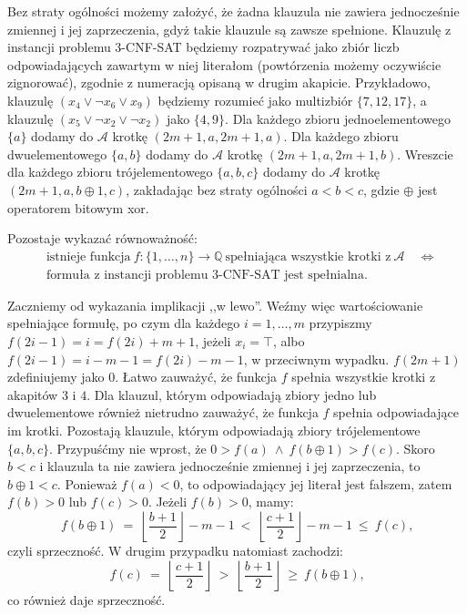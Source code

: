 \documentclass[12pt]{article}
\begin{document}
	\medskip
	
	Bez straty ogólności możemy założyć, że żadna klauzula nie zawiera
	jednocześnie zmiennej i jej zaprzeczenia, gdyż takie klauzule są zawsze
	spełnione. Klauzulę z instancji problemu 3-CNF-SAT będziemy rozpatrywać jako
	zbiór liczb odpowiadających zawartym w niej literałom (powtórzenia możemy
	oczywiście zignorować), zgodnie z numeracją opisaną w drugim akapicie.
	Przykładowo, klauzulę \((x_{4} \vee \neg x_{6} \vee x_{9})\) będziemy
	rozumieć jako multizbiór \(\{7, 12, 17\}\), a klauzulę \((x_{5} \vee \neg
	x_{2} \vee \neg x_{2})\) jako \(\{4, 9\}\). Dla każdego zbioru
	jednoelementowego \(\{a\}\) dodamy do \(\mathcal{A}\) krotkę \((2m + 1, a,
	2m + 1, a)\). Dla każdego zbioru dwuelementowego \(\{a, b\}\) dodamy do
	\(\mathcal{A}\) krotkę \((2m + 1, a, 2m + 1, b)\). Wreszcie dla każdego
	zbioru trójelementowego \(\{a, b, c\}\) dodamy do \(\mathcal{A}\) krotkę
	\((2m + 1, a, b \oplus 1, c)\), zakładając bez straty ogólności \(a < b <
	c\), gdzie \(\oplus\) jest operatorem bitowym xor.
	
	\medskip
	
	Pozostaje wykazać równoważność:
	\begin{align*}
		&\text{istnieje funkcja} \ f : \{1, \ldots, n\} \to \mathbb{Q} \
		\text{spełniająca wszystkie krotki z} \ \mathcal{A} \quad \iff \\
		&\text{formuła z instancji problemu 3-CNF-SAT jest spełnialna.}
	\end{align*}
	
	\medskip
	
	Zaczniemy od wykazania implikacji ,,w lewo''. Weźmy więc wartościowanie
	spełniające formułę, po czym dla każdego \(i = 1, \ldots, m\) przypiszmy
	\(f(2i - 1) = i = f(2i) + m + 1\), jeżeli \(x_{i} = \top\), albo \(f(2i - 1)
	= i - m - 1 = f(2i) - m - 1\), w przeciwnym wypadku. \(f(2m + 1)\)
	zdefiniujemy jako \(0\). Łatwo zauważyć, że funkcja \(f\) spełnia wszystkie
	krotki z akapitów \(3\) i \(4\). Dla klauzul, którym odpowiadają zbiory
	jedno lub dwuelementowe również nietrudno zauważyć, że funkcja \(f\) spełnia
	odpowiadające im krotki. Pozostają klauzule, którym odpowiadają zbiory
	trójelementowe \(\{a, b, c\}\). Przypuśćmy nie wprost, że \(0 > f(a) \
	\wedge \ f(b \oplus 1) > f(c)\). Skoro \(b < c\) i klauzula ta nie zawiera
	jednocześnie zmiennej i jej zaprzeczenia, to \(b \oplus 1 < c\). Ponieważ
	\(f(a) < 0\), to odpowiadający jej literał jest fałszem, zatem \(f(b) > 0\)
	lub \(f(c) > 0\). Jeżeli \(f(b) > 0\), mamy:
	\[ f(b \oplus 1) \ = \ \left\lfloor \frac{b + 1}{2} \right\rfloor - m - 1 \
	< \ \left\lfloor \frac{c + 1}{2} \right\rfloor - m - 1 \ \leqslant \ f(c)
	\text{,} \]
	czyli sprzeczność. W drugim przypadku natomiast zachodzi:
	\[ f(c) \ = \ \left\lfloor \frac{c + 1}{2} \right\rfloor \ > \ \left\lfloor
	\frac{b + 1}{2} \right\rfloor \ \geqslant \ f(b \oplus 1) \text{,} \]
	co również daje sprzeczność.
	
\end{document}
